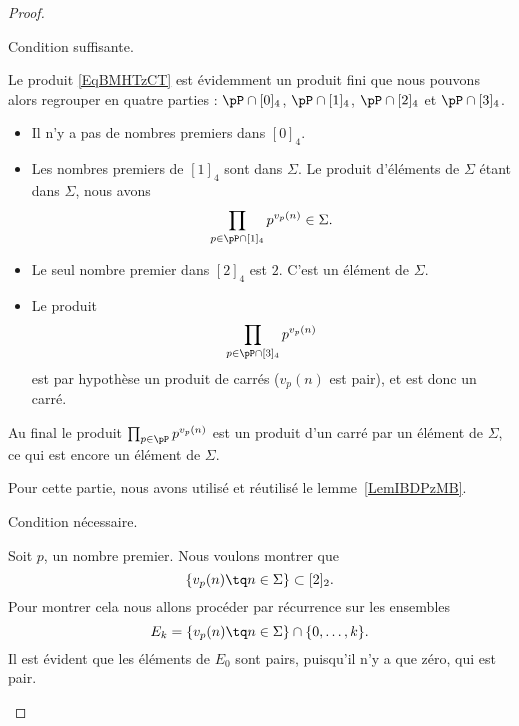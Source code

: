\begin{proof}
	\begin{subproof}
		\item[Condition suffisante.]

		Le produit \eqref{EqBMHTzCT} est évidemment un produit fini que nous pouvons alors regrouper en quatre parties : \( \pP\cap[0]_4\), \( \pP\cap[1]_4\), \( \pP\cap[2]_4\) et \( \pP\cap[3]_4\).

		\begin{itemize}
			\item Il n'y a pas de nombres premiers dans \( [0]_4\).
			\item Les nombres premiers de \( [1]_4\) sont dans \( \Sigma\). Le produit d'éléments de \( \Sigma\) étant dans \( \Sigma\), nous avons
			      \begin{equation}
				      \prod_{p\in\pP\cap[1]_4}p^{v_p(n)}\in \Sigma.
			      \end{equation}
			\item
			      Le seul nombre premier dans \( [2]_4\) est \( 2\). C'est un élément de \( \Sigma\).
			\item
			      Le produit
			      \begin{equation}
				      \prod_{p\in\pP\cap[3]_4}p^{v_p(n)}
			      \end{equation}
			      est par hypothèse un produit de carrés (\( v_p(n)\) est pair), et est donc un carré.
		\end{itemize}
		Au final le produit \( \prod_{p\in\pP}p^{v_p(n)}\) est un produit d'un carré par un élément de \( \Sigma\), ce qui est encore un élément de \( \Sigma\).

		Pour cette partie, nous avons utilisé et réutilisé le lemme~\ref{LemIBDPzMB}.

		\item[Condition nécessaire.]

		Soit \( p\), un nombre premier. Nous voulons montrer que
		\begin{equation}
			\{ v_p(n)\tq n\in \Sigma \}\subset [2]_2.
		\end{equation}
		Pour montrer cela nous allons procéder par récurrence sur les ensembles
		\begin{equation}
			E_k=\{ v_p(n)\tq n\in \Sigma \}\cap\{ 0,\ldots, k \}.
		\end{equation}
		Il est évident que les éléments de \( E_0\) sont pairs, puisqu'il n'y a que zéro, qui est pair.


\end{subproof}
\end{proof}
